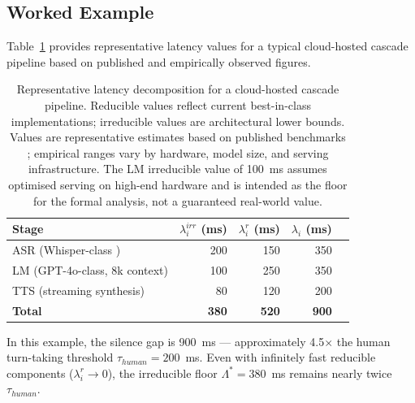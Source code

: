 \subsection{Worked Example}

Table~\ref{tab:latency_example} provides representative latency values for a
typical cloud-hosted cascade pipeline based on published and empirically observed figures.

\begin{table}[t]
  \centering
  \caption{Representative latency decomposition for a cloud-hosted cascade pipeline.
           Reducible values reflect current best-in-class implementations;
           irreducible values are architectural lower bounds.
           Values are representative estimates based on published benchmarks \citep{radford2022whisper,oord2016wavenet,vaswani2017attention}; empirical ranges vary by hardware, model size, and serving infrastructure.
           The LM irreducible value of 100~ms assumes optimised serving on high-end hardware and is intended as the floor for the formal analysis, not a guaranteed real-world value.}
  \label{tab:latency_example}
  \begin{tabular}{lrrrr}
    \toprule
    Stage & $\lambda_i^{irr}$ (ms) & $\lambda_i^r$ (ms) & $\lambda_i$ (ms) \\
    \midrule
    ASR (Whisper-class \citep{radford2022whisper})  & 200  & 150 & 350 \\
    LM  (GPT-4o-class, 8k context)                  & 100  & 250 & 350 \\
    TTS (streaming synthesis)                        & 80   & 120 & 200 \\
    \midrule
    \textbf{Total}                                   & \textbf{380} & \textbf{520} & \textbf{900} \\
    \bottomrule
  \end{tabular}
\end{table}

In this example, the silence gap is 900~ms --- approximately 4.5$\times$ the human
turn-taking threshold $\tau_{human} = 200$~ms.
Even with infinitely fast reducible components ($\lambda_i^r \to 0$),
the irreducible floor $\Lambda^* = 380$~ms remains nearly twice $\tau_{human}$.
